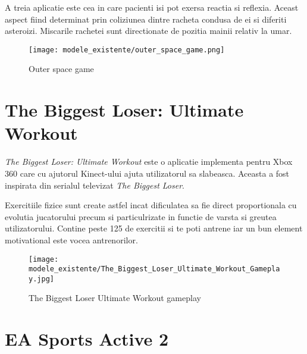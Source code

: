 \documentclass[12pt,a4paper]{report}
\begin{document}
A treia aplicatie este cea in care pacienti isi pot exersa reactia si reflexia. Aceast aspect fiind determinat prin coliziunea dintre racheta condusa de ei si diferiti asteroizi. Miscarile rachetei sunt directionate de pozitia mainii relativ la umar.

\begin{figure}[th]
\centering
\texttt{[image: modele\_existente/outer\_space\_game.png]}
  \caption[Outer space game]{Outer space game\protect\footnotemark}
  \label{figure_1:picture_4}
\end{figure}

\section{The Biggest Loser: Ultimate Workout}

\textit{The Biggest Loser: Ultimate Workout} este o aplicatie implementa pentru Xbox 360 care cu ajutorul Kinect-ului ajuta utilizatorul sa slabeasca. Aceasta a fost inspirata din serialul televizat \textit{The Biggest Loser}. 

Exercitiile fizice sunt create astfel incat dificulatea sa fie direct proportionala cu evolutia jucatorului precum si particulrizate in functie de varsta si greutea utilizatorului. Contine peste 125 de exercitii si te poti antrene iar un bun element motivational este vocea antrenorilor.

\begin{figure}[th]
\centering
\texttt{[image: modele\_existente/The\_Biggest\_Loser\_Ultimate\_Workout\_Gameplay.jpg]}
  \caption[The Biggest Loser Ultimate Workout gameplay]{The Biggest Loser Ultimate Workout gameplay\protect\footnotemark}
  \label{figure_1:picture_5}
\end{figure}


\section{EA Sports Active 2}
\end{document}
